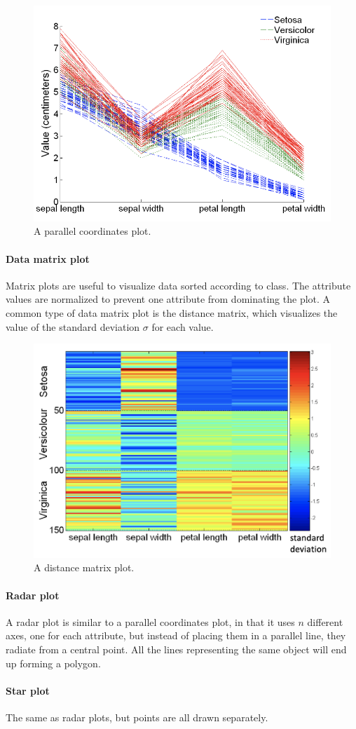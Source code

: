 \begin{figure}[ht]
    \centering
    \includegraphics[width=0.4\linewidth]{img/Parallel coord plot.png}  
    \caption{A parallel coordinates plot.}
\end{figure}

\paragraph{Data matrix plot}
Matrix plots are useful to visualize data sorted according to class. The attribute values are normalized to prevent one attribute from dominating the plot. A common type of data matrix plot is the distance matrix, which visualizes the value of the standard deviation $\sigma$ for each value.

\begin{figure}[ht]
    \centering
    \includegraphics[width=0.4\linewidth]{img/distance matrix.png}
    \caption{A distance matrix plot.}
\end{figure}

\paragraph{Radar plot}
A radar plot is similar to a parallel coordinates plot, in that it uses $n$ different axes, one for each attribute, but instead of placing them in a parallel line, they radiate from a central point. All the lines representing the same object will end up forming a polygon.

\paragraph{Star plot}
The same as radar plots, but points are all drawn separately.


